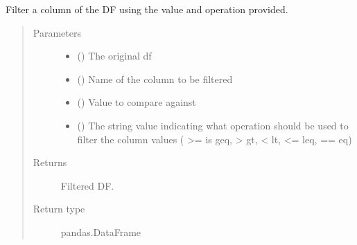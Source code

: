\documentclass[letterpaper,10pt,openany,oneside,english]{sphinxmanual}
\begin{document}
\begin{fulllineitems}
\label{\detokenize{index:loadPullDataAnalysis.dataXformation.filterColVal}}
\sphinxAtStartPar
Filter a column of the DF using the value and operation provided.
\begin{quote}\begin{description}
\item[{Parameters}] \leavevmode\begin{itemize}
\item {} 
\sphinxAtStartPar
{} () \textendash{} The original df

\item {} 
\sphinxAtStartPar
{} () \textendash{} Name of the column to be filtered

\item {} 
\sphinxAtStartPar
{} () \textendash{} Value to compare against

\item {} 
\sphinxAtStartPar
{} () \textendash{} The string  value indicating what operation should be used to filter the column values   ( \textgreater{}= is geq, \textgreater{} gt, \textless{} lt, \textless{}= leq, == eq)

\end{itemize}

\item[{Returns}] \leavevmode
\sphinxAtStartPar
Filtered DF.

\item[{Return type}] \leavevmode
\sphinxAtStartPar
pandas.DataFrame

\end{description}\end{quote}

\end{fulllineitems}
\end{document}
